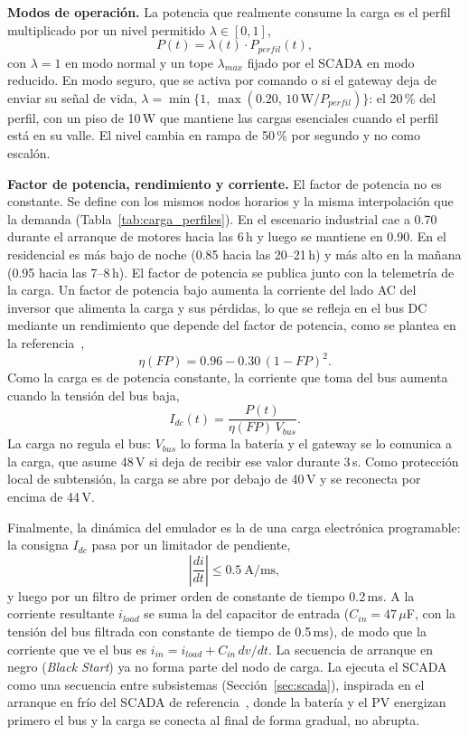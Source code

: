 \documentclass[conference]{IEEEtran}
\begin{document}
\textbf{Modos de operación.} La potencia que realmente consume la carga es el perfil multiplicado por un nivel permitido $\lambda\in[0,1]$,
\begin{equation}
\label{eq:load_P}
P(t) = \lambda(t)\cdot P_{perfil}(t),
\end{equation}
con $\lambda=1$ en modo normal y un tope $\lambda_{max}$ fijado por el SCADA en modo reducido. En modo seguro, que se activa por comando o si el gateway deja de enviar su señal de vida, $\lambda=\min\{1,\,\max(0.20,\,10\,\text{W}/P_{perfil})\}$: el 20\,\% del perfil, con un piso de 10\,W que mantiene las cargas esenciales cuando el perfil está en su valle. El nivel cambia en rampa de 50\,\% por segundo y no como escalón.

\textbf{Factor de potencia, rendimiento y corriente.} El factor de potencia no es constante. Se define con los mismos nodos horarios y la misma interpolación que la demanda (Tabla~\ref{tab:carga_perfiles}). En el escenario industrial cae a 0.70 durante el arranque de motores hacia las 6\,h y luego se mantiene en 0.90. En el residencial es más bajo de noche (0.85 hacia las 20--21\,h) y más alto en la mañana (0.95 hacia las 7--8\,h). El factor de potencia se publica junto con la telemetría de la carga. Un factor de potencia bajo aumenta la corriente del lado AC del inversor que alimenta la carga y sus pérdidas, lo que se refleja en el bus DC mediante un rendimiento que depende del factor de potencia, como se plantea en la referencia~\cite{hernandez2026carga},
\begin{equation}
\label{eq:load_eta}
\eta(FP) = 0.96 - 0.30\,(1-FP)^2.
\end{equation}
Como la carga es de potencia constante, la corriente que toma del bus aumenta cuando la tensión del bus baja,
\begin{equation}
\label{eq:load_I}
I_{dc}(t) = \frac{P(t)}{\eta(FP)\,V_{bus}}.
\end{equation}
La carga no regula el bus: $V_{bus}$ lo forma la batería y el gateway se lo comunica a la carga, que asume 48\,V si deja de recibir ese valor durante 3\,s. Como protección local de subtensión, la carga se abre por debajo de 40\,V y se reconecta por encima de 44\,V.

Finalmente, la dinámica del emulador es la de una carga electrónica programable: la consigna $I_{dc}$ pasa por un limitador de pendiente,
\begin{equation}
\label{eq:load_slew}
\left|\frac{di}{dt}\right| \le 0.5\ \text{A/ms},
\end{equation}
y luego por un filtro de primer orden de constante de tiempo 0.2\,ms. A la corriente resultante $i_{load}$ se suma la del capacitor de entrada ($C_{in}=47\,\mu$F, con la tensión del bus filtrada con constante de tiempo de 0.5\,ms), de modo que la corriente que ve el bus es $i_{in}=i_{load}+C_{in}\,dv/dt$.
La secuencia de arranque en negro (\emph{Black Start}) ya no forma parte del nodo de carga. La ejecuta el SCADA como una secuencia entre subsistemas (Sección~\ref{sec:scada}), inspirada en el arranque en frío del SCADA de referencia~\cite{alvarez2026scada}, donde la batería y el PV energizan primero el bus y la carga se conecta al final de forma gradual, no abrupta.
\end{document}

